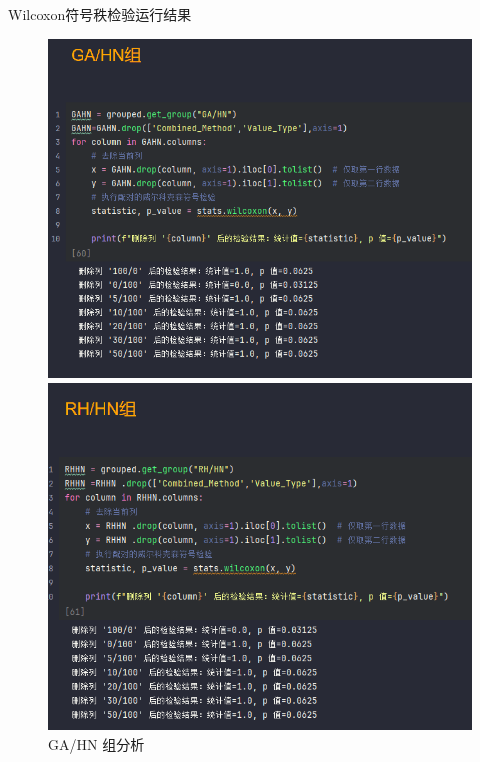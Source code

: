 \documentclass{beamer}
\begin{document}
\begin{frame}{Wilcoxon符号秩检验运行结果}
    \justifying
        \begin{figure}[htbp]
        \centering
        \begin{minipage}{0.3\linewidth}
            \centering
            \includegraphics[width=\linewidth]{pic/path_to_image5.png} %
            \caption{GA/HN 组分析}
        \end{minipage}
        \begin{minipage}{0.3\linewidth}
            \centering
            \includegraphics[width=\linewidth]{pic/path_to_image6.png} %

\end{minipage}
\end{figure}
\end{frame}
\end{document}

